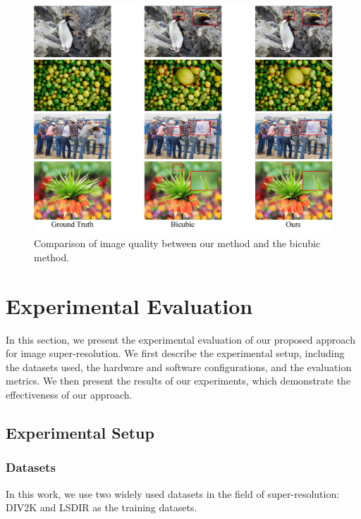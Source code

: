 \documentclass[10pt,twocolumn,letterpaper]{article}
\begin{document}
\begin{figure}[t]
    \begin{center}
    \includegraphics[width=\textwidth]{../x4result.pdf}
    \end{center}
    \caption{Comparison of image quality between our method and the bicubic method.}
    \label{yolov3}
\end{figure}

\section{Experimental Evaluation}
\label{sec:exp}
In this section, we present the experimental evaluation of our proposed approach for image super-resolution. We first describe the experimental setup, including the datasets used, the hardware and software configurations, and the evaluation metrics. We then present the results of our experiments, which demonstrate the effectiveness of our approach.

\subsection{Experimental Setup}

\subsubsection{Datasets}
In this work, we use two widely used datasets in the field of super-resolution: DIV2K\cite{div2k} and LSDIR\cite{lilsdir} as the training datasets.
\end{document}
